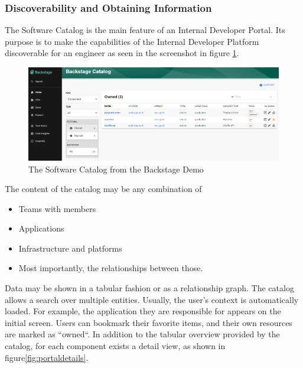 \documentclass[a4paper,10pt]{article}
\begin{document}
    \subsubsection{Discoverability and Obtaining Information}
    \label{sssec:disc}
    The Software Catalog is the main feature of an Internal Developer Portal.
    Its purpose is to make the capabilities of the Internal Developer Platform discoverable for an engineer as seen in the
    screenshot in figure \ref{fig:catalog}.\\

    \begin{figure}[h]
        \includegraphics[width=\linewidth]{backstage_catalog}
        \caption{The Software Catalog from the Backstage Demo\parencite{backstagedemo}}
        \label{fig:catalog}
    \end{figure}
    The content of the catalog may be any combination of
    \begin{itemize}
        \item Teams with members
        \item Applications
        \item Infrastructure and platforms
        \item Most importantly, the relationships between those.
    \end{itemize}
    Data may be shown in a tabular fashion or as a relationship graph.
    The catalog allows a search over multiple entities.
    Usually, the user's context is automatically loaded.
    For example, the application they are responsible for appears on the initial screen.
    Users can bookmark their favorite items, and their own resources are marked as ``owned``.
    In addition to the tabular overview provided by the catalog, for each component exists a detail view, as shown in
    figure\ref{fig:portaldetails}.
\end{document}

